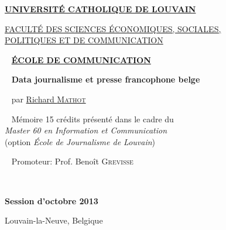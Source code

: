
\begin{center}

\Large \href{http://www.uclouvain.be/}{\textbf{UNIVERSITÉ CATHOLIQUE DE LOUVAIN}}

\large \href{http://www.uclouvain.be/espo}{FACULTÉ DES SCIENCES ÉCONOMIQUES, SOCIALES, \\
POLITIQUES ET DE COMMUNICATION}

~ \vfill
\large \href{http://www.uclouvain.be/comu}{\textbf{ÉCOLE DE COMMUNICATION}}

~ \vfill
\huge\textbf{Data journalisme et presse francophone belge}%

~ \vfill
\large par \href{mailto:richard.mathot@gmail.com}{Richard \textsc{Mathot}}

~ \vfill
\normalsize Mémoire 15 crédits présenté dans le cadre du \\
\emph{Master 60 en Information et Communication}\\
(option \emph{École de Journalisme de Louvain})

\end{center}


~ \vfill
\hspace{6cm} Promoteur: Prof. Benoît \textsc{Grevisse}



~ \vfill

\begin{center}
\normalsize \textbf{Session d'octobre 2013}

Louvain-la-Neuve, Belgique
\end{center}

\thispagestyle{empty}

